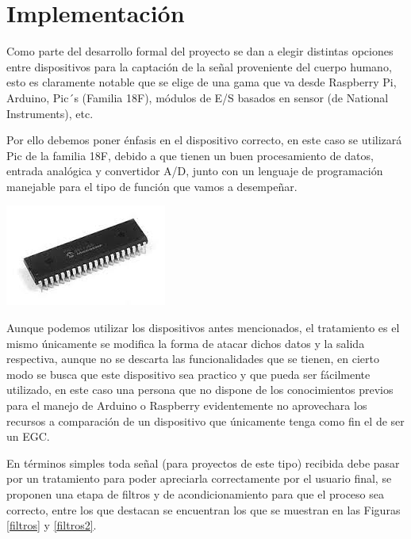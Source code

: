 \chapter{Implementación}
Como parte del desarrollo formal del proyecto se dan a elegir distintas opciones entre dispositivos para la captación de la señal proveniente del cuerpo humano, esto es claramente notable que se elige de una gama que va desde Raspberry Pi, Arduino, Pic´s (Familia 18F), módulos de E/S basados en sensor (de National Instruments), etc.\newline

Por ello debemos poner énfasis en el dispositivo correcto, en este caso se utilizará Pic de la familia 18F, debido a que tienen un buen procesamiento de datos, entrada analógica y convertidor A/D, junto con un lenguaje de programación manejable para el tipo de función que vamos a desempeñar.\newline
\begin{floatingfigure}[r]{3cm}
\includegraphics{imag/pic.jpg}
\end{floatingfigure}


Aunque podemos utilizar los dispositivos antes mencionados, el tratamiento es el mismo únicamente se modifica la forma de atacar dichos datos y la salida respectiva, aunque no se descarta las funcionalidades que se tienen, en cierto modo se busca que este dispositivo sea practico y que pueda ser fácilmente utilizado, en este caso una persona que no dispone de los conocimientos previos para el manejo de Arduino o Raspberry evidentemente no aprovechara los recursos a comparación de un dispositivo que únicamente tenga como fin el de ser un EGC.\newpage

En términos simples toda señal (para proyectos de este tipo) recibida debe pasar por un tratamiento para poder apreciarla correctamente por el usuario final, se proponen una etapa de filtros y de acondicionamiento para que el proceso sea correcto, entre los que destacan se encuentran los que se muestran en las Figuras \ref{filtros} y \ref{filtros2}.

